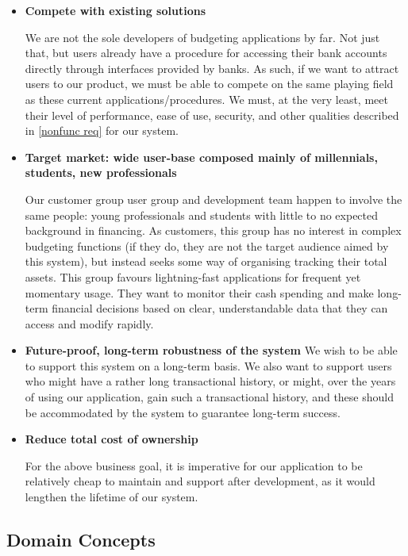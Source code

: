 \documentclass[11pt]{article}
\newcounter{use case ID}
\newcounter{req ID}
\begin{document}
\begin{itemize}
    \item \textbf{Compete with existing solutions}

        We are not the sole developers of budgeting applications by far. Not just that, but users already have a procedure for accessing their bank accounts directly through interfaces provided by banks. As such, if we want to attract users to our product, we must be able to compete on the same playing field as these current applications/procedures. We must, at the very least, meet their level of performance, ease of use, security, and other qualities described in \ref{nonfunc req} for our system.

    \item \textbf{Target market: wide user-base composed mainly of millennials, students, new professionals}

        Our customer group user group and development team happen to involve the same people: young professionals and students with little to no expected background in financing. As customers, this group has no interest in complex budgeting functions (if they do, they are not the target audience aimed by this system), but instead seeks some way of organising tracking their total assets. This group favours lightning-fast applications for frequent yet momentary usage. They want to monitor their cash spending and make long-term financial decisions based on clear, understandable data that they can access and modify rapidly.

    \item \textbf{Future-proof, long-term robustness of the system} We wish to be able to support this system on a long-term basis. We also want to support users who might have a rather long transactional history, or might, over the years of using our application, gain such a transactional history, and these should be accommodated by the system to guarantee long-term success.

    \item \textbf{Reduce total cost of ownership}

        For the above business goal, it is imperative for our application to be relatively cheap to maintain and support after development, as it would lengthen the lifetime of our system.

\end{itemize}

\subsection{Domain Concepts}
\end{document}
